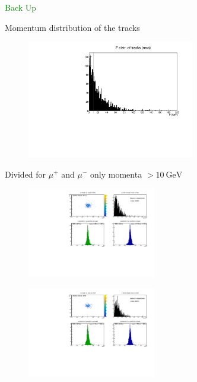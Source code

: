 \begin{frame}[t]{}
  \centering
  \textcolor{green}{\Huge{Back Up}}
\end{frame}



\begin{frame}[t]{Momentum distribution of the tracks}
  \begin{figure}
    \centering
    \includegraphics[width=0.65\textwidth]{../hists/nofield/mom_reco_tracks.pdf}
  \end{figure}
\end{frame}

\begin{frame}[t]{Divided for $\mu^+$ and $\mu^-$ only momenta $> \SI{10}{\giga\electronvolt}$}
  \begin{multicols}{2}
    \begin{figure}
      \centering
      \includegraphics[width=0.5\textwidth]{../hists/nofield/P/target_dist_amu.pdf}
    \end{figure}
    \columnbreak
    \begin{figure}
      \centering
      \includegraphics[width=0.5\textwidth]{../hists/nofield/P/target_dist_mu.pdf}
    \end{figure}
  \end{multicols}
\end{frame}

